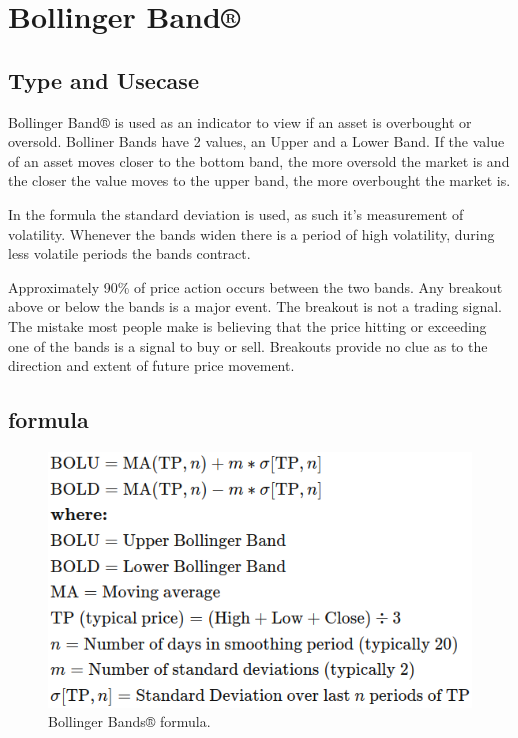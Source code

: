 \documentclass[12pt,a4paper]{article}
\begin{document}
\section{Bollinger Band®}

\subsection{Type and Usecase}
Bollinger Band® is used as an indicator to view if an asset is overbought or oversold. Bolliner Bands have 2 values, an Upper and a Lower Band. If the value of an asset moves closer to the bottom band, the more oversold the market is and the closer the value moves to the upper band, the more overbought the market is.

In the formula the standard deviation is used, as such it's measurement of volatility. Whenever the bands widen there is a period of high volatility, during less volatile periods the bands contract.

Approximately 90\% of price action occurs between the two bands. Any breakout above or below the bands is a major event. The breakout is not a trading signal. The mistake most people make is believing that the price hitting or exceeding one of the bands is a signal to buy or sell. Breakouts provide no clue as to the direction and extent of future price movement.

\subsection{formula}

\begin{figure}[H]
    \includegraphics[scale=0.7]{../images/BollingerBands.png}
    \caption{Bollinger Bands® formula.}
    \label{fig:BollingerBands}
\end{figure}
\end{document}
